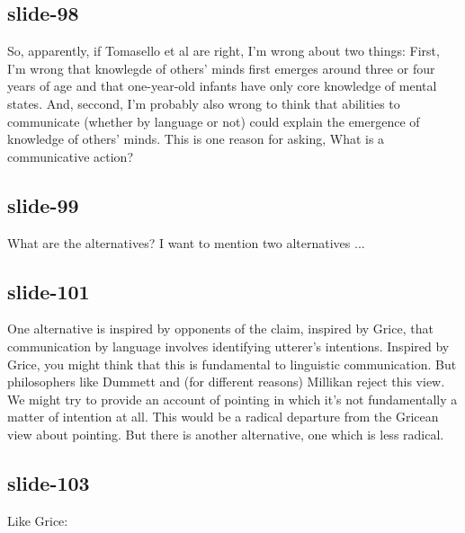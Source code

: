 \documentclass[12pt,\papersize]{extarticle}
\begin{document}
 
\subsection{slide-98}
So, apparently, if Tomasello et al are right, I'm wrong about two things:
First, I'm wrong that knowlegde of others' minds first emerges around three or four years of age and that one-year-old infants have only core knowledge of mental states.
And, seccond, I'm probably also wrong to think that abilities to communicate (whether by language or not) could explain the emergence of knowledge of others' minds.
This is one reason for asking, What is a communicative action?
 
 
\subsection{slide-99}
What are the alternatives?
I want to mention two alternatives ...
 
 
\subsection{slide-101}
One alternative is inspired by opponents of the claim, inspired by Grice, that communication by language involves identifying utterer's intentions.
Inspired by Grice, you might think that this is fundamental to linguistic communication.
But philosophers like Dummett and (for different reasons) Millikan reject this view.
We might try to provide an account of pointing in which it's not fundamentally a matter of intention at all.
This would be a radical departure from the Gricean view about pointing. But there is another alternative, one which is less radical.
 
 
\subsection{slide-103}
Like Grice:
 
 
\end{document}
